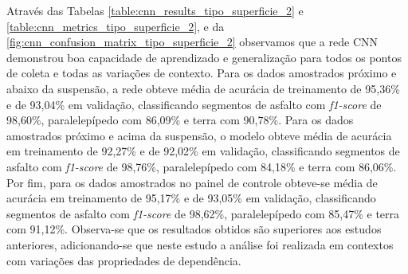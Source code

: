 Através das Tabelas \ref{table:cnn_results_tipo_superficie_2} e \ref{table:cnn_metrics_tipo_superficie_2}, e da \autoref{fig:cnn_confusion_matrix_tipo_superficie_2} observamos que a rede CNN demonstrou boa capacidade de aprendizado e generalização para todos os pontos de coleta e todas as variações de contexto. Para os dados amostrados próximo e abaixo da suspensão, a rede obteve média de acurácia de treinamento de 95,36\% e de 93,04\% em validação, classificando segmentos de asfalto com \textit{f1-score} de 98,60\%, paralelepípedo com 86,09\% e terra com 90,78\%. Para os dados amostrados próximo e acima da suspensão, o modelo obteve média de acurácia em treinamento de 92,27\% e de 92,02\% em validação, classificando segmentos de asfalto com \textit{f1-score} de 98,76\%, paralelepípedo com 84,18\% e terra com 86,06\%. Por fim, para os dados amostrados no painel de controle obteve-se média de acurácia em treinamento de 95,17\% e de 93,05\% em validação, classificando segmentos de asfalto com \textit{f1-score} de 98,62\%, paralelepípedo com 85,47\% e terra com 91,12\%. Observa-se que os resultados obtidos são superiores aos estudos anteriores, adicionando-se que neste estudo a análise foi realizada em contextos com variações das propriedades de dependência.